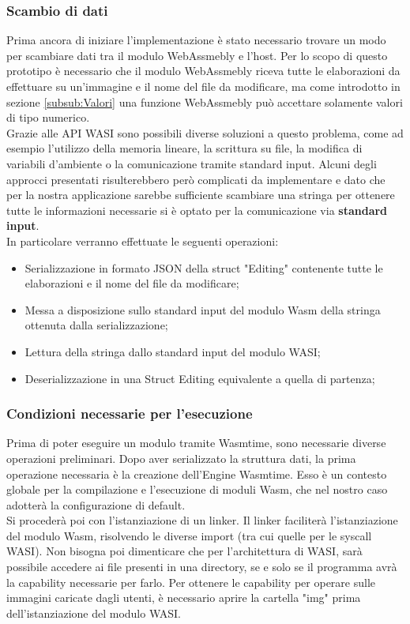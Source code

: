 \subsubsection{Scambio di dati}
Prima ancora di iniziare l'implementazione è stato necessario trovare un modo per scambiare dati tra il modulo WebAssmebly e l'host. Per lo scopo di questo prototipo è necessario che il modulo WebAssmebly riceva tutte le elaborazioni da effettuare su un'immagine e il nome del file da modificare, ma come introdotto in sezione \ref{subsub:Valori} una funzione WebAssmebly può accettare solamente valori di tipo numerico.
\\Grazie alle API WASI sono possibili diverse soluzioni a questo problema, come ad esempio l'utilizzo della memoria lineare, la scrittura su file, la modifica di variabili d'ambiente o la comunicazione tramite standard input.
Alcuni degli approcci presentati risulterebbero però complicati da implementare e dato che per la nostra applicazione sarebbe sufficiente scambiare una stringa per ottenere tutte le informazioni necessarie si è optato per la comunicazione via \textbf{standard input}.
\\In particolare verranno effettuate le seguenti operazioni:
\begin{itemize}
    \item Serializzazione in formato JSON della struct "Editing" contenente tutte le elaborazioni  e il nome del file da modificare;
    \item Messa a disposizione sullo standard input del modulo Wasm della stringa ottenuta dalla serializzazione;
    \item Lettura della stringa dallo standard input del modulo WASI;
    \item Deserializzazione in una Struct Editing equivalente a quella di partenza;
\end{itemize}
\subsubsection{Condizioni necessarie per l'esecuzione}
Prima di poter eseguire un modulo tramite Wasmtime, sono necessarie diverse operazioni preliminari.
Dopo aver serializzato la struttura dati, la prima operazione necessaria è la creazione dell'Engine Wasmtime. Esso è un contesto globale per la compilazione e l'esecuzione di moduli Wasm, che nel nostro caso adotterà la configurazione di default.
\\Si procederà poi con l'istanziazione di un linker. Il linker faciliterà l'istanziazione del modulo Wasm, risolvendo le diverse import (tra cui quelle per le syscall WASI).
Non bisogna poi dimenticare che per l'architettura di WASI, sarà possibile accedere ai file presenti in una directory, se e solo se il programma avrà la capability necessarie per farlo. 
Per ottenere le capability per operare sulle immagini caricate dagli utenti, è necessario aprire la cartella "img" prima dell'istanziazione del modulo WASI.

